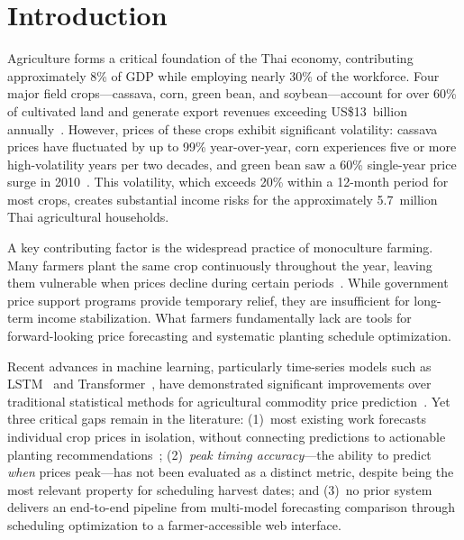 \documentclass[journal]{IEEEtran}
\begin{document}
\section{Introduction}

Agriculture forms a critical foundation of the Thai economy, contributing approximately 8\% of GDP while employing nearly 30\% of the workforce. Four major field crops---cassava, corn, green bean, and soybean---account for over 60\% of cultivated land and generate export revenues exceeding US\$13~billion annually~\cite{oae2024stats, oae2024forecast, ocsb2024, thairice2024}. However, prices of these crops exhibit significant volatility: cassava prices have fluctuated by up to 99\% year-over-year, corn experiences five or more high-volatility years per two decades, and green bean saw a 60\% single-year price surge in 2010~\cite{waqas2024climate}. This volatility, which exceeds 20\% within a 12-month period for most crops, creates substantial income risks for the approximately 5.7~million Thai agricultural households.

A key contributing factor is the widespread practice of monoculture farming. Many farmers plant the same crop continuously throughout the year, leaving them vulnerable when prices decline during certain periods~\cite{asg2014}. While government price support programs provide temporary relief, they are insufficient for long-term income stabilization. What farmers fundamentally lack are tools for forward-looking price forecasting and systematic planting schedule optimization.

Recent advances in machine learning, particularly time-series models such as LSTM~\cite{hochreiter1997lstm} and Transformer~\cite{vaswani2017attention}, have demonstrated significant improvements over traditional statistical methods for agricultural commodity price prediction~\cite{rohan2025crop}. Yet three critical gaps remain in the literature: (1)~most existing work forecasts individual crop prices in isolation, without connecting predictions to actionable planting recommendations~\cite{javaid2023ai}; (2)~\textit{peak timing accuracy}---the ability to predict \textit{when} prices peak---has not been evaluated as a distinct metric, despite being the most relevant property for scheduling harvest dates; and (3)~no prior system delivers an end-to-end pipeline from multi-model forecasting comparison through scheduling optimization to a farmer-accessible web interface.
\end{document}

